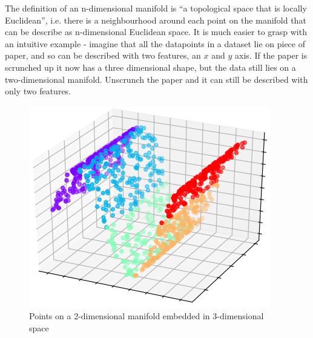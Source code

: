 The definition of an n-dimensional manifold is ``a 
topological space that is locally Euclidean'', i.e. there is a neighbourhood around each point on the manifold that can be describe as n-dimensional 
Euclidean space. It is much easier to grasp with an intuitive example - imagine that all the datapoints in a 
dataset lie on piece of paper, and so can be described with two features, an $x$ and $y$ axis. If the paper is scrunched up 
it now has a three dimensional shape, but the data still lies on a two-dimensional manifold. Unscrunch the paper and it can still 
be described with only two features.
\begin{figure}[H]
  \centering
  \includegraphics[scale=.75]{figs/manifold.png}
  \caption{Points on a 2-dimensional manifold embedded in 3-dimensional space}
  \label{fig:manifold}
\end{figure}

